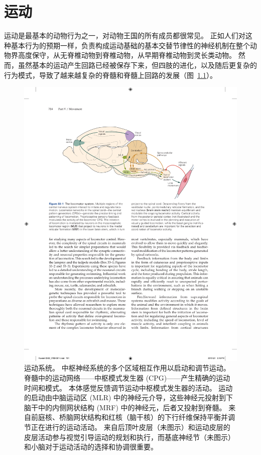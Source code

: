 \chapter{运动} \label{chap:chap33}

运动是最基本的动物行为之一，对动物王国的所有成员都很常见。
正如人们对这种基本行为的预期一样，负责构成运动基础的基本交替节律性的神经机制在整个动物界高度保守，从无脊椎动物到脊椎动物，从早期脊椎动物到灵长类动物。 
然而，虽然基本的运动产生回路已经被保存下来，但四肢的进化，以及随后更复杂的行为模式，导致了越来越复杂的脊髓和脊髓上回路的发展（图~\ref{fig:33_1}）。


\begin{figure}[htbp]
	\centering
	\includegraphics[width=0.85\linewidth]{chap33/fig_33_1}
	\caption{运动系统。
	中枢神经系统的多个区域相互作用以启动和调节运动。
	脊髓中的运动网络——中枢模式发生器 (CPG)——产生精确的运动时间和模式。
	本体感觉反馈调节运动中枢模式发生器的活动。
	运动的启动由中脑运动区 (MLR) 中的神经元介导，这些神经元投射到下脑干中的内侧网状结构 (MRF) 中的神经元，后者又投射到脊髓。
	来自前庭核、桥脑网状结构和红核（脑干核）的下行纤维保持平衡并调节正在进行的运动活动。
	来自后顶叶皮层（未图示）和运动皮层的皮层活动参与视觉引导运动的规划和执行，而基底神经节（未图示）和小脑对于运动活动的选择和协调很重要。}
	\label{fig:33_1}
\end{figure}


